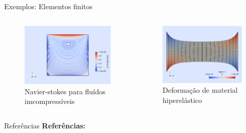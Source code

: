 \documentclass{beamer}
\begin{document}
		\begin{frame}{Exemplos: Elementos finitos}
			\begin{columns}
				\begin{column}{.5\linewidth}
					\begin{figure}
						\includegraphics[width=\linewidth]{navierstokes2d}
						\caption{Navier-stokes para fluídos imcompressíveis}
					\end{figure}
				\end{column}
				\begin{column}{.5\linewidth}
					\begin{figure}
						\includegraphics[width=\linewidth]{neohook}
						\caption{Deformação de material hiperelástico}
					\end{figure}
				\end{column}			
			\end{columns}
		\end{frame}
		\begin{frame}{Referências}
			\fontsize{9pt}{10pt}
			\textbf{Referências:}
			
			
		\end{frame}
\end{document}
